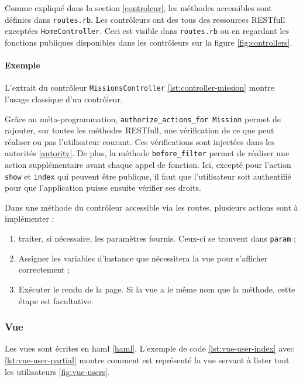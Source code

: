 Comme expliqué dans la section \ref{controleur}, les méthodes accessibles sont définies dans \texttt{routes.rb}. Les contrôleurs ont des tous des ressources RESTfull exceptées \texttt{HomeController}. Ceci est visible dans \texttt{routes.rb} ou en regardant les fonctions publiques disponibles dans les contrôleurs sur la figure \ref{fig:controllers}.

\paragraph{Exemple}
L'extrait du contrôleur \texttt{MissionsController} \ref{lst:controller-mission} montre l'usage classique d'un contrôleur. 


Grâce au méta-programmation, \lstinline[language=Rails]{authorize_actions_for Mission} permet de rajouter, sur toutes les méthodes RESTfull, une vérification de ce que peut réaliser ou pas l'utilisateur courant. Ces vérifications sont injectées dans les autorités \ref{autority}. De plus, la méthode \lstinline[language=Rails]{before_filter} permet de réaliser une action supplémentaire avant chaque appel de fonction. Ici, excepté pour l'action \texttt{show} et \texttt{index} qui peuvent être publique, il faut que l'utilisateur soit authentifié pour que l'application puisse ensuite vérifier ses droits. %

Dans une méthode du contrôleur accessible via les routes, plusieurs actions sont à implémenter :
\begin{enumerate}
  \item traiter, si nécessaire, les paramètres fournis. Ceux-ci se trouvent dans \lstinline[language=Rails]{param} ;
  \item Assigner les variables d'instance que nécessitera la vue pour s'afficher correctement ;
  \item Exécuter le rendu de la page. Si la vue a le même nom que la méthode, cette étape est facultative.
\end{enumerate}

\subsubsection{Vue}
\label{vues}
Les vues sont écrites en haml \ref{haml}. L'exemple de code \ref{lst:vue-user-index} avec \ref{lst:vue-user-partial} montre comment est représenté la vue servant à lister tout les utilisateurs \ref{fig:vue-users}.

